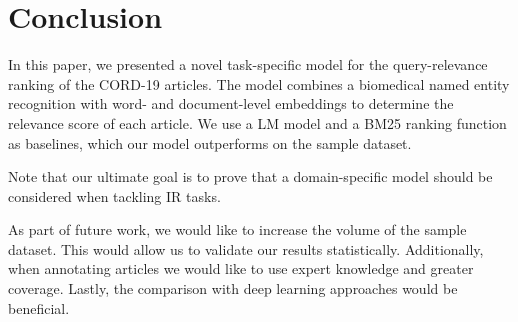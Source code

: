 \documentclass[10pt, a4paper]{article}
\begin{document}
	\section{Conclusion}

	In this paper, we presented a novel task-specific model for the query-relevance ranking of the CORD-19 articles. The model combines a biomedical named entity recognition with word- and document-level embeddings to determine the relevance score of each article. We use a LM model and a BM25 ranking function as baselines, which our model outperforms on the sample dataset.

	Note that our ultimate goal is to prove that a domain-specific model should be considered when tackling IR tasks.

	As part of future work, we would like to increase the volume of the sample dataset. This would allow us to validate our results statistically. Additionally, when annotating articles we would like to use expert knowledge and greater coverage. Lastly, the comparison with deep learning approaches would be beneficial.




\end{document}
